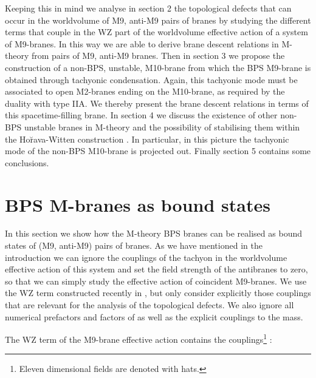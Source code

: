 \documentclass[12pt,a4paper]{article}
\begin{document}
Keeping this in mind we analyse in section 2 the topological defects 
that can occur in the
worldvolume of \coordHE{} M9, anti-M9 pairs of branes by studying the different
terms that couple in the WZ part of the worldvolume effective action
of a system of \coordHE{} M9-branes. In this way we are able to derive
brane descent relations in M-theory from pairs of M9, anti-M9
branes. Then in section 3 we propose the construction of  a 
non-BPS, unstable, M10-brane from which the BPS M9-brane is obtained
through tachyonic condensation. Again, this tachyonic mode must be
associated to open M2-branes ending on the M10-brane, as required
by the duality with type IIA.
We thereby present the brane descent relations in terms of this 
spacetime-filling brane. In section 4 we discuss the existence of
other non-BPS unstable branes in M-theory and the possibility of
stabilising them within the Ho\u{r}ava-Witten construction \cite{HW}.
In particular, in this picture the tachyonic mode of the non-BPS 
M10-brane is projected out. Finally section 5 contains some conclusions.





 
\section{BPS M-branes as bound states}

In this section we show how the M-theory BPS branes can be realised as
bound states of \coordHE{} (M9, anti-M9) pairs of branes. As we have mentioned
in the introduction we can ignore the couplings of the tachyon in
the worldvolume effective action of this system and set the field 
strength of the antibranes to zero, so that we can 
simply study the effective action of \coordHE{} coincident M9-branes. 
We use the WZ term 
constructed recently in \cite{Sato}, but
only consider explicitly those couplings
that are relevant for the analysis of the topological defects. 
We also ignore all numerical prefactors and factors of \myHighlight{$\alpha^\prime$}\coordHE{}
as well as the explicit couplings to the mass.

The WZ term of the M9-brane effective action contains the 
couplings\footnote{Eleven
dimensional fields are denoted with hats.} \cite{Sato}:
\end{document}
